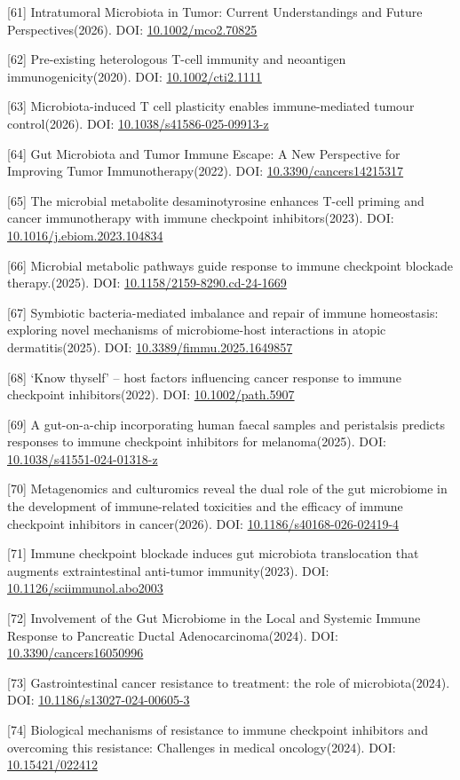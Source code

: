 \documentclass[11pt]{article}
\begin{document}
{[}61{]} Intratumoral Microbiota in Tumor: Current Understandings and Future Perspectives(2026). DOI: \url{10.1002/mco2.70825}

{[}62{]} Pre-existing heterologous T-cell immunity and neoantigen immunogenicity(2020). DOI: \url{10.1002/cti2.1111}

{[}63{]} Microbiota-induced T cell plasticity enables immune-mediated tumour control(2026). DOI: \url{10.1038/s41586-025-09913-z}

{[}64{]} Gut Microbiota and Tumor Immune Escape: A New Perspective for Improving Tumor Immunotherapy(2022). DOI: \url{10.3390/cancers14215317}

{[}65{]} The microbial metabolite desaminotyrosine enhances T-cell priming and cancer immunotherapy with immune checkpoint inhibitors(2023). DOI: \url{10.1016/j.ebiom.2023.104834}

{[}66{]} Microbial metabolic pathways guide response to immune checkpoint blockade therapy.(2025). DOI: \url{10.1158/2159-8290.cd-24-1669}

{[}67{]} Symbiotic bacteria-mediated imbalance and repair of immune homeostasis: exploring novel mechanisms of microbiome-host interactions in atopic dermatitis(2025). DOI: \url{10.3389/fimmu.2025.1649857}

{[}68{]} `Know thyself' -- host factors influencing cancer response to immune checkpoint inhibitors(2022). DOI: \url{10.1002/path.5907}

{[}69{]} A gut-on-a-chip incorporating human faecal samples and peristalsis predicts responses to immune checkpoint inhibitors for melanoma(2025). DOI: \url{10.1038/s41551-024-01318-z}

{[}70{]} Metagenomics and culturomics reveal the dual role of the gut microbiome in the development of immune-related toxicities and the efficacy of immune checkpoint inhibitors in cancer(2026). DOI: \url{10.1186/s40168-026-02419-4}

{[}71{]} Immune checkpoint blockade induces gut microbiota translocation that augments extraintestinal anti-tumor immunity(2023). DOI: \url{10.1126/sciimmunol.abo2003}

{[}72{]} Involvement of the Gut Microbiome in the Local and Systemic Immune Response to Pancreatic Ductal Adenocarcinoma(2024). DOI: \url{10.3390/cancers16050996}

{[}73{]} Gastrointestinal cancer resistance to treatment: the role of microbiota(2024). DOI: \url{10.1186/s13027-024-00605-3}

{[}74{]} Biological mechanisms of resistance to immune checkpoint inhibitors and overcoming this resistance: Challenges in medical oncology(2024). DOI: \url{10.15421/022412}
\end{document}
